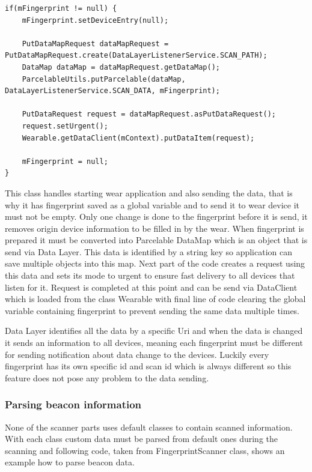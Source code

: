 \begin{lstlisting}[caption=Sending Fingerprint to Wear]
if(mFingerprint != null) {
	mFingerprint.setDeviceEntry(null);
	
	PutDataMapRequest dataMapRequest = PutDataMapRequest.create(DataLayerListenerService.SCAN_PATH);
	DataMap dataMap = dataMapRequest.getDataMap();
	ParcelableUtils.putParcelable(dataMap, DataLayerListenerService.SCAN_DATA, mFingerprint);
	
	PutDataRequest request = dataMapRequest.asPutDataRequest();
	request.setUrgent();
	Wearable.getDataClient(mContext).putDataItem(request);
	
	mFingerprint = null;
}
\end{lstlisting}

This class handles starting wear application and also sending the data, that is why it has fingerprint saved as a global variable and to send it to wear device it must not be empty. Only one change is done to the fingerprint before it is send, it removes origin device information to be filled in by the wear. When fingerprint is prepared it must be converted into Parcelable DataMap which is an object that is send via Data Layer. This data is identified by a string key so application can save multiple objects into this map. Next part of the code creates a request using this data and sets its mode to urgent to ensure fast delivery to all devices that listen for it. Request is completed at this point and can be send via DataClient which is loaded from the class Wearable with final line of code clearing the global variable containing fingerprint to prevent sending the same data multiple times.

Data Layer identifies all the data by a specific Uri and when the data is changed it sends an information to all devices, meaning each fingerprint must be different for sending notification about data change to the devices. Luckily every fingerprint has its own specific id and scan id which is always different so this feature does not pose any problem to the data sending.

\subsubsection{Parsing beacon information}\label{subsubsec:ParsingBeaconInformation}
None of the scanner parts uses default classes to contain scanned information. With each class custom data must be parsed from default ones during the scanning and following code, taken from FingerprintScanner class, shows an example how to parse beacon data.

